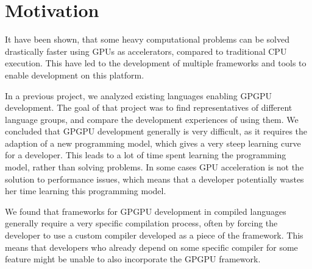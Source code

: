 \section{Motivation}\label{cha:motivation}
It have been shown, that some heavy computational problems can be solved drastically faster using GPUs as accelerators, compared to traditional CPU execution. This have led to the development of multiple frameworks and tools to enable development on this platform.

In a previous project\cite{sw9Report}, we analyzed existing languages enabling GPGPU development. The goal of that project was to find representatives of different language groups, and compare the development experiences of using them. We concluded that GPGPU development generally is very difficult, as it requires the adaption of a new programming model, which gives a very steep learning curve for a developer. This leads to a lot of time spent learning the programming model, rather than solving problems. In some cases GPU acceleration is not the solution to performance issues, which means that a developer potentially wastes her time learning this programming model.

We found that frameworks for GPGPU development in compiled languages generally require a very specific compilation process, often by forcing the developer to use a custom compiler developed as a piece of the framework. This means that developers who already depend on some specific compiler for some feature might be unable to also incorporate the GPGPU framework.




